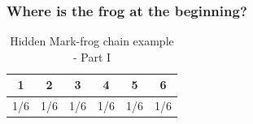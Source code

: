 \documentclass[xcolor=dvipsnames, compress]{beamer}
\begin{document}
\begin{frame}
\frametitle{Where is the frog at the beginning?}


\begin{table}
	\begin{centering}
		\begin{tabular}{|c|c|c|c|c|c|}
			\hline 
			1 & 2 & 3 & 4 & 5 & 6\\
			\hline 
			\hline 
			1/6 & 1/6 & 1/6 & 1/6 & 1/6 & 1/6\\
			\hline 
		\end{tabular}
	\end{centering}
	\caption{Hidden Mark-frog chain example - Part I}
\end{table}
\end{frame}
\end{document}
